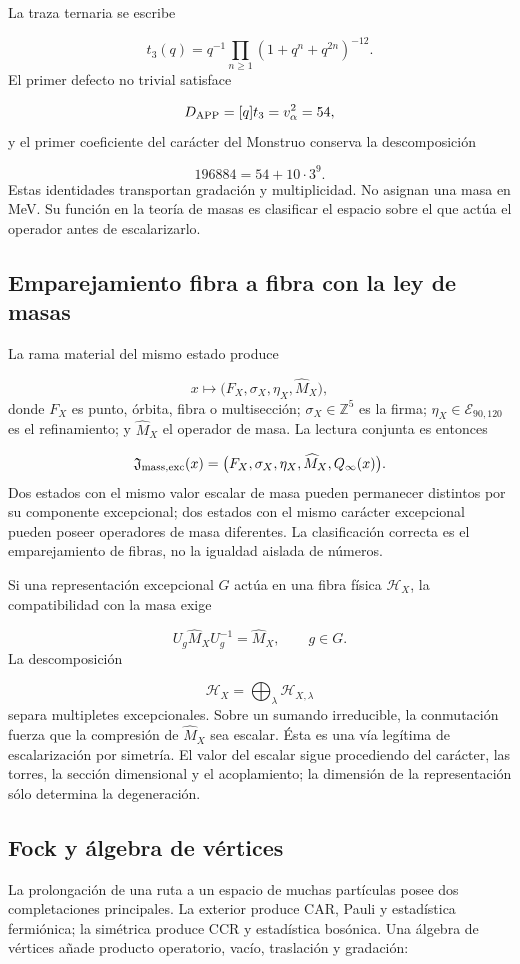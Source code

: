La traza ternaria se escribe

\[
t_3(q)=q^{-1}
\prod_{n\ge1}(1+q^n+q^{2n})^{-12}.
\]
El primer defecto no trivial satisface

\[
D_{\rm APP}=[q]t_3=v_\alpha^2=54,
\]
y el primer coeficiente del carácter del Monstruo conserva la descomposición

\[
196884=54+10\cdot3^9.
\]
Estas identidades transportan gradación y multiplicidad. No asignan una masa en MeV. Su función en la teoría de masas es clasificar el espacio sobre el que actúa el operador antes de escalarizarlo.

\subsection{Emparejamiento fibra a fibra con la ley de masas}
La rama material del mismo estado produce

\[
x\longmapsto
\bigl(F_X,\sigma_X,\eta_X,\widehat M_X\bigr),
\]
donde \(F_X\) es punto, órbita, fibra o multisección; \(\sigma_X\in\mathbb Z^5\) es la firma; \(\eta_X\in\mathcal E_{90,120}\) es el refinamiento; y \(\widehat M_X\) el operador de masa. La lectura conjunta es entonces

\[
\mathfrak J_{\rm mass,exc}(x)
=\bigl(F_X,\sigma_X,\eta_X,\widehat M_X,Q_\infty(x)\bigr).
\]
Dos estados con el mismo valor escalar de masa pueden permanecer distintos por su componente excepcional; dos estados con el mismo carácter excepcional pueden poseer operadores de masa diferentes. La clasificación correcta es el emparejamiento de fibras, no la igualdad aislada de números.

Si una representación excepcional \(G\) actúa en una fibra física \(\mathcal H_X\), la compatibilidad con la masa exige

\[
U_g\widehat M_XU_g^{-1}=\widehat M_X,
\qquad g\in G.
\]
La descomposición

\[
\mathcal H_X=\bigoplus_{\lambda}
\mathcal H_{X,\lambda}
\]
separa multipletes excepcionales. Sobre un sumando irreducible, la conmutación fuerza que la compresión de \(\widehat M_X\) sea escalar. Ésta es una vía legítima de escalarización por simetría. El valor del escalar sigue procediendo del carácter, las torres, la sección dimensional y el acoplamiento; la dimensión de la representación sólo determina la degeneración.

\subsection{Fock y álgebra de vértices}
La prolongación de una ruta a un espacio de muchas partículas posee dos completaciones principales. La exterior produce CAR, Pauli y estadística fermiónica; la simétrica produce CCR y estadística bosónica. Una álgebra de vértices añade producto operatorio, vacío, traslación y gradación:

